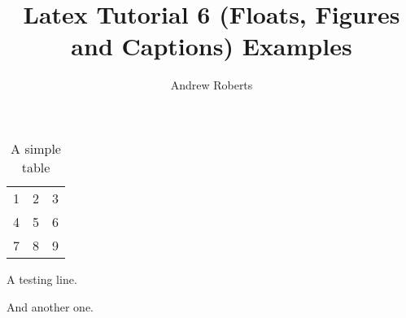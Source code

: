 \documentclass[english]{article}
\begin{document}
\title{Latex Tutorial 6 (Floats, Figures and Captions) Examples}
\author{Andrew Roberts}
\maketitle

\begin{table}[htp]
  \begin{center}
    \begin{tabular}{| l c r |}
    \hline
    1 & 2 & 3 \\
    4 & 5 & 6 \\
    7 & 8 & 9 \\
    \hline
    \end{tabular}
  \end{center}
  \caption{A simple table}
\end{table}

A testing line.

And another one.
\end{document}
